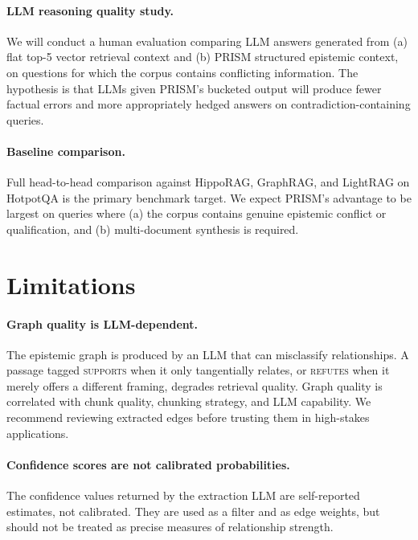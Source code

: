 \documentclass[11pt,a4paper]{article}
\begin{document}
\paragraph{LLM reasoning quality study.}
We will conduct a human evaluation comparing LLM answers generated from
(a) flat top-5 vector retrieval context and (b) PRISM structured epistemic
context, on questions for which the corpus contains conflicting information.
The hypothesis is that LLMs given PRISM's bucketed output will produce
fewer factual errors and more appropriately hedged answers on
contradiction-containing queries.

\paragraph{Baseline comparison.}
Full head-to-head comparison against HippoRAG, GraphRAG, and LightRAG
on HotpotQA is the primary benchmark target. We expect PRISM's advantage
to be largest on queries where (a) the corpus contains genuine epistemic
conflict or qualification, and (b) multi-document synthesis is required.


\section{Limitations}
\label{sec:limitations}

\paragraph{Graph quality is LLM-dependent.}
The epistemic graph is produced by an LLM that can misclassify relationships.
A passage tagged \textsc{supports} when it only tangentially relates, or
\textsc{refutes} when it merely offers a different framing, degrades retrieval
quality. Graph quality is correlated with chunk quality, chunking strategy,
and LLM capability. We recommend reviewing extracted edges before
trusting them in high-stakes applications.

\paragraph{Confidence scores are not calibrated probabilities.}
The confidence values returned by the extraction LLM are self-reported
estimates, not calibrated. They are used as a filter and as edge weights,
but should not be treated as precise measures of relationship strength.
\end{document}
